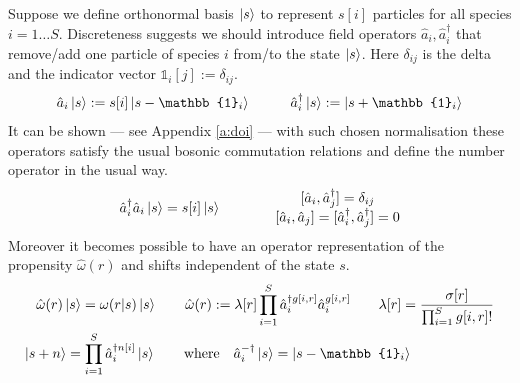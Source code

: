 \documentclass{article}[12pt]
\numberwithin{equation}{section}
\begin{document}
Suppose we define orthonormal basis $\ket{s}$ to represent $s[i]$ particles for
all species $i=1\dots S$. Discreteness suggests we should introduce field operators
$\hat{a}_i,\hat{a}_i^{\dagger}$ that remove/add one particle of species $i$ from/to the state
$\ket{s}$. Here $\delta_{ij}$ is the delta and the indicator vector $\mathbb{1}_i[j]:=\delta_{ij}$.
\begin{align}
	\begin{matrix}
		\hat{a}_i\ket{s}:=s[i]\ket{s-\mathbb{1}_i} &&& \hat{a}_i^{\dagger}\ket{s}:=\ket{s+\mathbb{1}_i}
	\end{matrix}
	\label{eq:fieldoperators}
\end{align}
It can be shown --- see Appendix \ref{a:doi} --- with such chosen
normalisation these operators
satisfy the usual bosonic commutation relations and define the number operator
in the usual way.
\begin{align}
	\begin{matrix}
		\hat{a}_i^{\dagger}\hat{a}_i\ket{s}=s[i]\ket{s}
	\end{matrix}
	\qquad\qquad
	\begin{matrix}
		[\hat{a}_i,\hat{a}_j^{\dagger}]=\delta_{ij} \\
		[\hat{a}_i,\hat{a}_j]=[\hat{a}_i^{\dagger},\hat{a}_j^{\dagger}]=0
	\end{matrix}
	\label{eq:commutationrelations}
\end{align}
Moreover it becomes possible to have an
operator representation of the propensity $\hat\omega(r)$ and shifts independent
of the state $s$.
\begin{align}
	\hat\omega(r)\ket{s}=\omega(r|s)\ket{s}
	\qquad
	\hat\omega(r):=
	\lambda[r]
	\prod_{i=1}^S
	\hat{a}_i^{\dagger g[i,r]}\hat{a}_i^{g[i,r]}
	\qquad
	\lambda[r]=
	\frac{\sigma[r]}{\prod_{i=1}^Sg[i,r]!}
	\label{eq:propensityoperator}
	\\
	\ket{s+n} =
	\prod_{i=1}^S\hat{a}_i^{\dagger n[i]}
	\ket{s}\qquad
	\text{where}\quad
	\hat{a}_i^{-\dagger}\ket{s}=\ket{s-\mathbb{1}_i}
	\qquad\qquad\qquad
	\label{eq:shiftoperator}
\end{align}
\pagebreak
\end{document}
